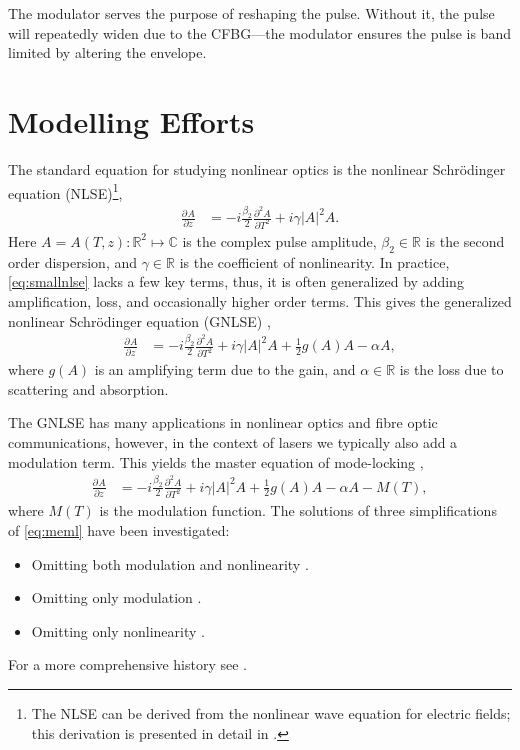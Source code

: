 \documentclass[10pt,twocolumn,a4paper]{article}
\newcommand{\pdiff}[3][]{\frac{\partial^{#1}#2}{\partial{#3}^{#1}}}
\begin{document}
The modulator serves the purpose of reshaping the pulse. Without it, the pulse will repeatedly widen due to the CFBG---the modulator ensures the pulse is band limited by altering the envelope. 

\section{Modelling Efforts}
\label{sec:modelling}
The standard equation for studying nonlinear optics is the nonlinear Schr\"odinger equation (NLSE)\footnote{The NLSE can be derived from the nonlinear wave equation for electric fields; this derivation is presented in detail in \cite{agrawal2013, ferreira}.},
\begin{align}
\pdiff{A}{z} &= - i \frac{\beta_2}{2}\pdiff[2]{A}{T} + i \gamma |A|^2 A.
\label{eq:smallnlse}
\end{align}
Here $A = A(T, z) : \mathbb{R}^2 \mapsto \mathbb{C}$ is the complex pulse amplitude, $\beta_2 \in \mathbb{R}$ is the second order dispersion, and $\gamma \in \mathbb{R}$ is the coefficient of nonlinearity. In practice, \eqref{eq:smallnlse} lacks a few key terms, thus, it is often generalized by adding amplification, loss, and occasionally higher order terms. This gives the generalized nonlinear Schr\"{o}dinger equation (GNLSE) \cite{agrawal2013, bohun, finot, peng, shtyrina, yarutkina},
\begin{align}
\label{eq:nlse}
\pdiff{A}{z} &= - i \frac{\beta_2}{2}\pdiff[2]{A}{T} + i \gamma |A|^2 A + \frac{1}{2}g(A) A - \alpha A,
\end{align}
where $g(A)$ is an amplifying term due to the gain, and $\alpha \in \mathbb{R}$ is the loss due to scattering and absorption.

The GNLSE has many applications in nonlinear optics and fibre optic communications, however, in the context of lasers we typically also add a modulation term. This yields the master equation of mode-locking \cite{haus1975, hausbook, haus1986, haus1992, haus2000, kartner, tamura1996, usechak},
\begin{align}
\pdiff{A}{z} &= - i \frac{\beta_2}{2}\pdiff[2]{A}{T} + i \gamma |A|^2 A + \frac{1}{2}g(A) A - \alpha A - M(T),
\label{eq:meml}
\end{align}
where $M(T)$ is the modulation function. The solutions of three simplifications of \eqref{eq:meml} have been investigated:
\begin{itemize}
\item Omitting both modulation and nonlinearity \cite{haus1975, haus1986, haus1992}.
\item Omitting only modulation \cite{haus1991, usechak}.
\item Omitting only nonlinearity  \cite{burgoyne2014, haus1975, hausbook, haus1996, haus2000, kartner, tamura1996, usechak}.
\end{itemize}
For a more comprehensive history see \cite{haus2000}.
\end{document}
